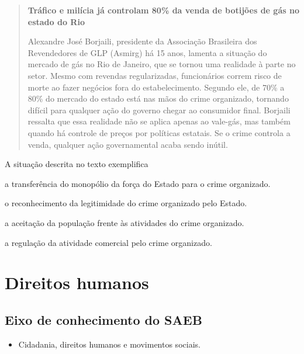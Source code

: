 \begin{quote}
\textbf{Tráfico e milícia já controlam 80\% da venda de botijões de gás no estado do Rio}

Alexandre José Borjaili, presidente da Associação Brasileira dos
Revendedores de GLP (Asmirg) há 15 anos, lamenta a situação do mercado
de gás no Rio de Janeiro, que se tornou uma realidade à parte no setor.
Mesmo com revendas regularizadas, funcionários correm risco de morte ao
fazer negócios fora do estabelecimento. Segundo ele, de 70\% a 80\% do
mercado do estado está nas mãos do crime organizado, tornando difícil
para qualquer ação do governo chegar ao consumidor final. Borjaili
ressalta que essa realidade não se aplica apenas ao vale-gás, mas também
quando há controle de preços por políticas estatais. Se o crime controla
a venda, qualquer ação governamental acaba sendo inútil.

\end{quote}

A situação descrita no texto exemplifica

\begin{escolha}
\item
  a transferência do monopólio da força do Estado para o crime
  organizado.
\item
  o reconhecimento da legitimidade do crime organizado pelo Estado.
\item
  a aceitação da população frente às atividades do crime organizado.
\item
  a regulação da atividade comercial pelo crime organizado.
\end{escolha}

\chapter{Direitos humanos}

\section{Eixo de conhecimento do SAEB}

\begin{itemize}
  \item 
Cidadania, direitos humanos e movimentos sociais.
\end{itemize}

